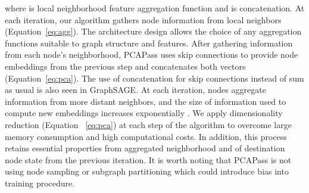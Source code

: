 \documentclass[nohyperref]{article}
\theoremstyle{plain}
\theoremstyle{definition}
\theoremstyle{remark}
\begin{document}
where  is local neighborhood feature aggregation function and  is concatenation. 
At each iteration, our algorithm gathers node information from local neighbors (Equation~\ref{eq:agg}). 
The architecture design allows the choice of any aggregation functions suitable to graph structure and features. 
After gathering information from each node's neighborhood, PCAPass uses skip connections to provide node embeddings from the previous step and concatenates both vectors (Equation~\ref{eq:pca}). 
The use of concatenation for skip connections instead of sum as usual is also seen in GraphSAGE.
At each iteration, nodes aggregate information from more distant neighbors, and the size of information used to compute new embeddings increases exponentially .
We apply dimensionality reduction (Equation ~\ref{eq:pca}) at each step of the algorithm to overcome large memory consumption and high computational costs.
In addition, this process retains essential properties from aggregated neighborhood and of destination node state from the previous iteration.   
It is worth noting that PCAPass is not using node sampling or subgraph partitioning which could introduce bias into training procedure.
\end{document}
